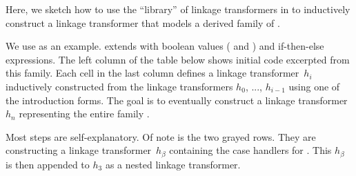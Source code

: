 Here, we sketch how to use the ``library'' of linkage
transformers in \TT to inductively construct a linkage transformer that models a
derived family of .

We use  as an example.  extends
 with boolean values ( and )
and if-then-else expressions.
The left column of the table below shows initial code excerpted from
this family.
Each cell in the last column defines a linkage transformer~$h_i$
inductively constructed from the linkage transformers $h_0$, ..., $h_{i-1}$
using one of the introduction forms.
The goal is to eventually construct a linkage transformer $h_n$ representing
the entire family .

Most steps are self-explanatory.
Of note is the two grayed rows. They are constructing a linkage transformer~$h_\beta$
containing the case handlers for .
This $h_\beta$ is then appended to $h_3$ as a nested linkage transformer.

\medskip

